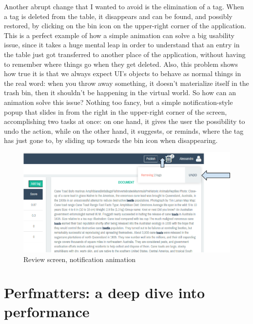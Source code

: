 \documentclass[12pt,svgnames]{memoir}
\begin{document}
Another abrupt change that I wanted to avoid is the elimination of a
tag. When a tag is deleted from the table, it disappears and can be
found, and possibly restored, by clicking on the bin icon on the
upper-right corner of the application. This is a perfect example of how
a simple animation can solve a big usability issue, since it takes a
huge mental leap in order to understand that an entry in the table just
got transferred to another place of the application, without having to
remember where things go when they get deleted. Also, this problem shows
how true it is that we always expect UI's objects to behave as normal
things in the real word: when you throw away something, it doesn't
materialize itself in the trash bin, then it shouldn't be happening in
the virtual world. So how can an animation solve this issue? Nothing too
fancy, but a simple notification-style popup that slides in from the
right in the upper-right corner of the screen, accomplishing two tasks
at once: on one hand, it gives the user the possibility to undo the
action, while on the other hand, it suggests, or reminds, where the tag
has just gone to, by sliding up towards the bin icon when disappearing.

\begin{figure}[htbp]
\centering
\includegraphics{./src/img/review-notification-animation.png}
\caption{Review screen, notification animation}
\end{figure}

\chapter{Perfmatters: a deep dive into
performance}\label{perfmatters-a-deep-dive-into-performance}
\end{document}
